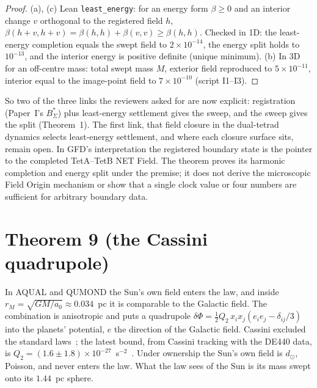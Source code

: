 \documentclass[twocolumn]{iopjournal}
\begin{document}
\begin{proof}
(a), (c) Lean \texttt{least\_energy}: for an energy form $\beta \ge 0$
and an interior change $v$ orthogonal to the registered field $h$,
$\beta(h+v,h+v) = \beta(h,h) + \beta(v,v) \ge \beta(h,h)$. Checked in 1D:
the least-energy completion equals the swept field to
$2\times10^{-14}$, the energy split holds to $10^{-13}$, and the
interior energy is positive definite (unique minimum). (b) In 3D for
an off-centre mass: total swept mass $M$, exterior field reproduced to
$5\times10^{-11}$, interior equal to the image-point field to
$7\times10^{-10}$ (script I1--I3).
\end{proof}

So two of the three links the reviewers asked for are now explicit:
registration (Paper~I's $B^*_\Sigma$) plus least-energy settlement
gives the sweep, and the sweep gives the split (Theorem~1). The first
link, that field closure in the dual-tetrad dynamics selects
least-energy settlement, and where each closure surface sits, remain
open. In GFD's interpretation the registered boundary state is the
pointer to the completed TetA--TetB NET Field. The theorem proves
its harmonic completion and energy split under the premise; it
does not derive the microscopic Field Origin mechanism or show
that a single clock value or four numbers are sufficient for
arbitrary boundary data.


\section*{Theorem 9 (the Cassini quadrupole)}

In AQUAL and QUMOND the Sun's own field enters the law, and inside
$r_M = \sqrt{GM/a_0} \approx 0.034$~pc it is comparable to the
Galactic field. The combination is anisotropic and puts a quadrupole
$\delta\Phi = \tfrac12 Q_2\,x_ix_j(e_ie_j - \delta_{ij}/3)$ into the
planets' potential, $e$ the direction of the Galactic field. Cassini
excluded the standard laws~\cite{Hees2014}; the latest bound, from
Cassini tracking with the DE440 data, is $Q_2 = (1.6 \pm 1.8)\times
10^{-27}$~s$^{-2}$~\cite{Park2026}. Under ownership the Sun's own field
is $d_\odot$, Poisson, and never enters the law. What the law sees of
the Sun is its mass swept onto its $1.44$~pc sphere.
\end{document}
